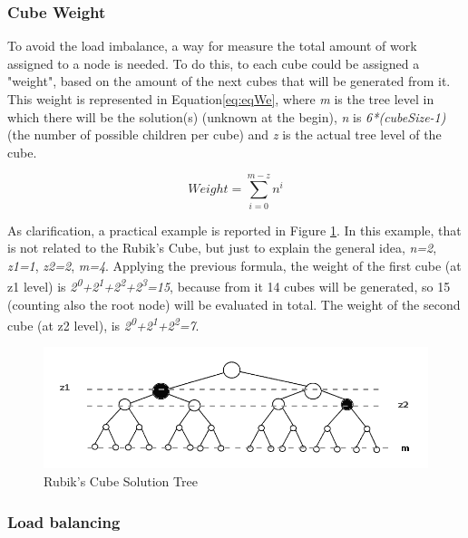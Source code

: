 \documentclass[a4paper]{article}
\begin{document}
\subsubsection{Cube Weight}
\label{sec:cw}

To avoid the load imbalance, a way for measure the total amount of work assigned to a node is needed. To do this, to each cube could be assigned a "weight", based on the amount of the next cubes that will be generated from it. This weight is represented in Equation\ref{eq:eqWe}, where \textit{m} is the tree level in which there will be the solution(s) (unknown at the begin), \textit{n} is \textit{6*(cubeSize-1)} (the number of possible children per cube) and \textit{z} is the actual tree level of the cube.

\begin{equation} 
\label{eq:eqWe}
Weight = \sum_{i=0}^{m-z}{n^i}
\end{equation}
\FloatBarrier

As clarification, a practical example is reported in Figure \ref{fig:treeBin}. In this example, that is not related to the Rubik's Cube, but just to explain the general idea, \textit{n=2}, \textit{z1=1}, \textit{z2=2}, \textit{m=4}. Applying the previous formula, the weight of the first cube (at z1 level) is \textit{2\textsuperscript{0}+2\textsuperscript{1}+2\textsuperscript{2}+2\textsuperscript{3}=15}, because from it 14 cubes will be generated, so 15 (counting also the root node) will be evaluated in total. The weight of the second cube (at z2 level), is \textit{2\textsuperscript{0}+2\textsuperscript{1}+2\textsuperscript{2}=7}. 

\begin{figure}[ht]
  \centering
  \includegraphics[width=0.8\linewidth]{tree_bin}
  \caption{Rubik's Cube Solution Tree}
  \label{fig:treeBin}
\end{figure}
\FloatBarrier

\subsubsection{Load balancing}
\label{sec:lb}
\end{document}

